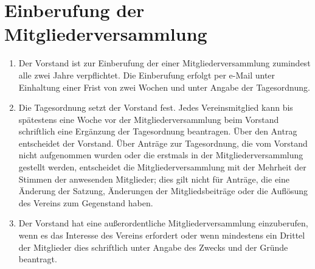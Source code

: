 \section{Einberufung der Mitgliederversammlung}
\begin{enumerate}[label=(\arabic*)]
    \item Der Vorstand ist zur Einberufung der einer Mitgliederversammlung
        zumindest alle zwei Jahre verpflichtet. Die Einberufung erfolgt
        per e-Mail unter Einhaltung einer Frist von zwei Wochen und unter
        Angabe der Tagesordnung.
    \item Die Tagesordnung setzt der Vorstand fest. Jedes Vereinsmitglied kann
        bis spätestens eine Woche vor der Mitgliederversammlung beim Vorstand
        schriftlich eine Ergänzung der Tagesordnung beantragen. Über den Antrag
        entscheidet der Vorstand. Über Anträge zur Tagesordnung, die vom
        Vorstand nicht aufgenommen wurden oder die erstmals in der
        Mitgliederversammlung gestellt werden, entscheidet die
        Mitgliederversammlung mit der Mehrheit der Stimmen der anwesenden
        Mitglieder; dies gilt nicht für Anträge, die eine Änderung der Satzung,
        Änderungen der Mitgliedsbeiträge oder die Auflösung des Vereins zum
        Gegenstand haben.
    \item Der Vorstand hat eine außerordentliche Mitgliederversammlung
        einzuberufen, wenn es das Interesse des Vereins erfordert oder wenn
        mindestens ein Drittel der Mitglieder dies schriftlich unter Angabe des
        Zwecks und der Gründe beantragt.
\end{enumerate}

